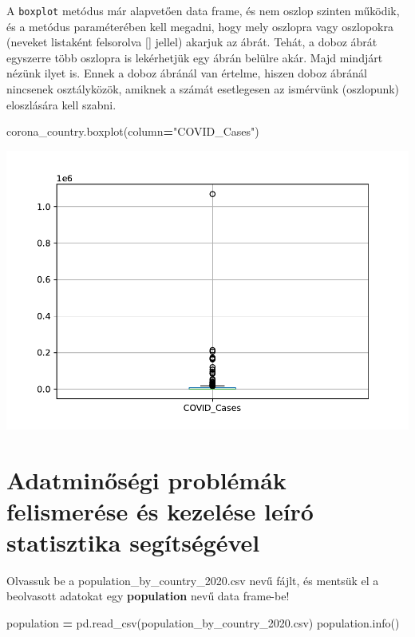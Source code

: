 \documentclass[
]{book}
\newenvironment{Shaded}{\begin{snugshade}}{\end{snugshade}}
\newcommand{\NormalTok}[1]{#1}
\newcommand{\OperatorTok}[1]{\textcolor[rgb]{0.81,0.36,0.00}{\textbf{#1}}}
\newcommand{\StringTok}[1]{\textcolor[rgb]{0.31,0.60,0.02}{#1}}
\begin{document}
A \texttt{boxplot} metódus már alapvetően data frame, és nem oszlop szinten működik, és a metódus paraméterében kell megadni, hogy mely oszlopra vagy oszlopokra (neveket listaként felsorolva {[}{]} jellel) akarjuk az ábrát. Tehát, a doboz ábrát egyszerre több oszlopra is lekérhetjük egy ábrán belülre akár. Majd mindjárt nézünk ilyet is. Ennek a doboz ábránál van értelme, hiszen doboz ábránál nincsenek osztályközök, amiknek a számát esetlegesen az ismérvünk (oszlopunk) eloszlására kell szabni.

\begin{Shaded}
\begin{Highlighting}[]
\NormalTok{corona\_country.boxplot(column}\OperatorTok{=}\StringTok{"COVID\_Cases"}\NormalTok{)}
\end{Highlighting}
\end{Shaded}

\includegraphics{_main_files/figure-latex/unnamed-chunk-97-7.pdf}

\section{Adatminőségi problémák felismerése és kezelése leíró statisztika segítségével}\label{adatminux151suxe9gi-probluxe9muxe1k-felismeruxe9se-uxe9s-kezeluxe9se-leuxedruxf3-statisztika-seguxedtsuxe9guxe9vel}

Olvassuk be a population\_by\_country\_2020.csv nevű fájlt, és mentsük el a beolvasott adatokat egy \textbf{population} nevű data frame-be!

\begin{Shaded}
\begin{Highlighting}[]
\NormalTok{population }\OperatorTok{=}\NormalTok{ pd.read\_csv(}\StringTok{\textquotesingle{}population\_by\_country\_2020.csv\textquotesingle{}}\NormalTok{)}
\NormalTok{population.info()}
\end{Highlighting}
\end{Shaded}
\end{document}
